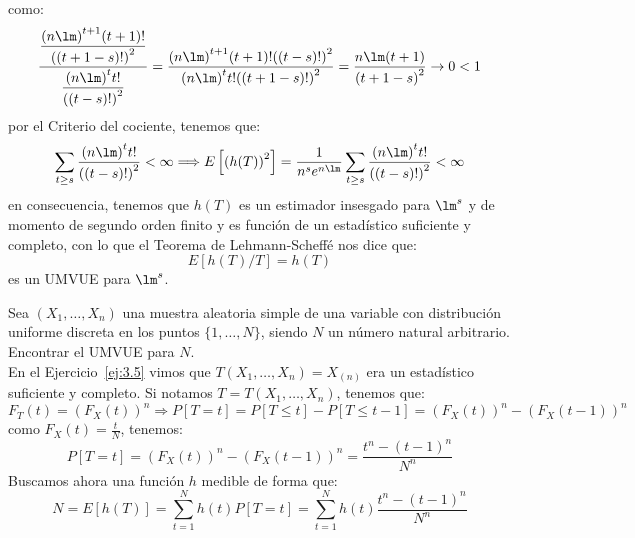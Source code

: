 \begin{ejercicio}
    como:
    \begin{equation*}
        \dfrac{\dfrac{{(n\lm)}^{t+1}(t+1)!}{{((t+1-s)!)}^{2}}}{\dfrac{{(n\lm)}^{t}t!}{{((t-s)!)}^{2}}} = \dfrac{{(n\lm)}^{t+1}(t+1)!{((t-s)!)}^{2}}{{(n\lm)}^{t}t!{((t+1-s)!)}^{2}} = \dfrac{n\lm(t+1)}{{(t+1-s)}^{2}} \to 0 < 1
    \end{equation*}
    por el Criterio del cociente, tenemos que:
    \begin{equation*}
        \sum_{t\geq s} \dfrac{{(n\lm)}^{t}t!}{{((t-s)!)}^{2}} < \infty \Longrightarrow E\left[{(h(T))}^{2}\right]  =\dfrac{1}{n^s e^{n\lm}}\sum_{t\geq s} \dfrac{{(n\lm)}^{t}t!}{{((t-s)!)}^{2}}   < \infty
    \end{equation*}
    en consecuencia, tenemos que $h(T)$ es un estimador insesgado para $\lm^s$ y de momento de segundo orden finito y es función de un estadístico suficiente y completo, con lo que el Teorema de Lehmann-Scheffé nos dice que:
    \begin{equation*}
        E[h(T)/T] = h(T)
    \end{equation*}
    es un UMVUE para $\lm^s$.
\end{ejercicio}

\begin{ejercicio}
    Sea $(X_1, \ldots, X_n)$ una muestra aleatoria simple de una variable con distribución uniforme discreta en los puntos $\{1,\ldots,N\}$, siendo $N$ un número natural arbitrario. Encontrar el UMVUE para $N$.\\

    \noindent
    En el Ejercicio~\ref{ej:3.5} vimos que $T(X_1, \ldots, X_n) = X_{(n)}$ era un estadístico suficiente y completo. Si notamos $T = T(X_1,\ldots, X_n)$, tenemos que:
    \begin{equation*}
        F_T(t) = {(F_X(t))}^{n} \Longrightarrow P[T=t] = P[T\leq t] - P[T\leq t-1] = {(F_X(t))}^{n}-{(F_X(t-1))}^{n}
    \end{equation*}
    como $F_X(t) = \frac{t}{N}$, tenemos:
    \begin{equation*}
        P[T=t] = {(F_X(t))}^{n}-{(F_X(t-1))}^{n} = \dfrac{t^n - {(t-1)}^{n}}{N^n}
    \end{equation*} 
    Buscamos ahora una función $h$ medible de forma que:
    \begin{equation*}
        N = E[h(T)] = \sum_{t=1}^{N}h(t) P[T=t] = \sum_{t=1}^{N}h(t)\dfrac{t^n-{(t-1)}^{n}}{N^n}
    \end{equation*}
\end{ejercicio}


